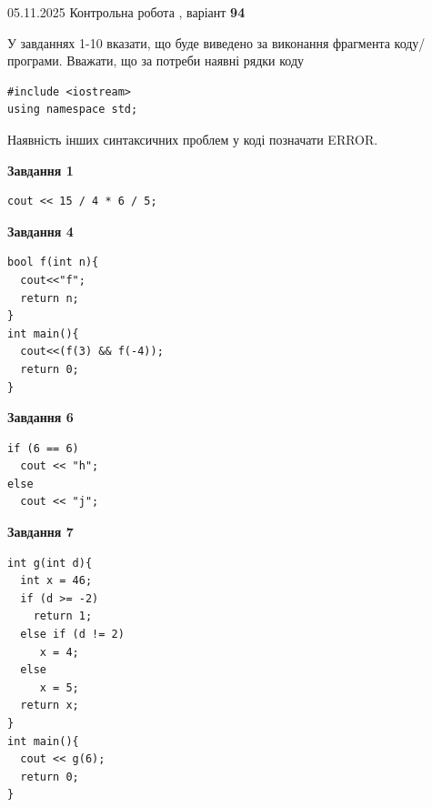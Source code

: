 \documentclass[12pt, ukrainian]{article}
\begin{document}
{\Large{05.11.2025 Контрольна робота , варіант  \No \textbf { 94 }\par}}
{
\begin {large}
У завданнях 1-10 вказати, що буде виведено за виконання фрагмента коду/про\-гра\-ми.
Вважати, що за потреби наявні рядки коду
\begin{verbatim}
#include <iostream>
using namespace std;
\end{verbatim}
Наявність інших синтаксичних проблем у коді позначати ERROR.

\begin{minipage}[t]{7.0cm}

\begin{center}
\textbf{Завдання 1}
\end{center}
\vspace{-8mm}

\begin{verbatim}
cout << 15 / 4 * 6 / 5;
\end{verbatim}



\begin{center}
\textbf{Завдання 4}
\end{center}
\vspace{-8mm}

\begin{verbatim}
bool f(int n){
  cout<<"f";
  return n;
}
int main(){
  cout<<(f(3) && f(-4));
  return 0;
}
\end{verbatim}



\begin{center}
\textbf{Завдання 6}
\end{center}
\vspace{-8mm}

\begin{verbatim}
if (6 == 6)
  cout << "h";
else
  cout << "j";
\end{verbatim}



\begin{center}
\textbf{Завдання 7}
\end{center}
\vspace{-8mm}

\begin{verbatim}
int g(int d){
  int x = 46;
  if (d >= -2)
    return 1;
  else if (d != 2)
     x = 4;
  else
     x = 5;
  return x;
}
int main(){
  cout << g(6);
  return 0;
}
\end{verbatim}


\end{minipage}
\end{large}}
\end{document}
